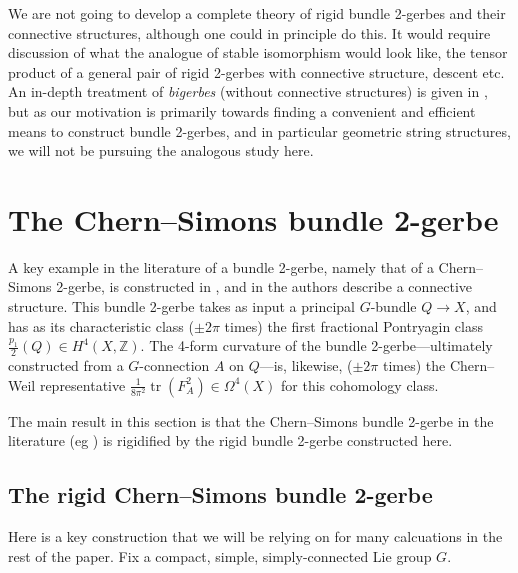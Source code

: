 \documentclass[12pt]{amsart}
\DeclareMathOperator{\tr}{tr}
\theoremstyle{plain}
\theoremstyle{definition}
\theoremstyle{remark}
\numberwithin{equation}{section}
\newcommand{\ZZ}{{\mathbb Z}}
\newcommand{\<}{\langle}
\renewcommand{\>}{\rangle}
\begin{document}

We are not going to develop a complete theory of rigid bundle 2-gerbes and their connective structures, although one could in principle do this. 
It would require discussion of what the analogue of stable isomorphism would look like, the tensor product of a general pair of rigid 2-gerbes with connective structure, descent etc. 
An in-depth treatment of \emph{bigerbes} (without connective structures) is given in \cite{KM19}, but as our motivation is primarily towards finding a convenient and efficient means to construct bundle 2-gerbes, and in particular geometric string structures, we will not be pursuing the analogous study here.





\section{The Chern--Simons bundle 2-gerbe}\label{sec:CS2-gerbe}

A key example in the literature of a bundle 2-gerbe, namely that of a Chern--Simons 2-gerbe, is constructed in \cite{StevPhD}, and in \cite{JohnsonPhD,CJMSW} the authors describe a connective structure.
This bundle 2-gerbe takes as input a principal $G$-bundle $Q\to X$, and has as its characteristic class ($\pm2\pi$ times) the first fractional Pontryagin class $\frac{p_1}{2}(Q)\in H^4(X,\ZZ)$. 
The 4-form curvature of the bundle 2-gerbe---ultimately constructed from a $G$-connection $A$ on $Q$---is, likewise, ($\pm 2\pi$ times) the Chern--Weil representative $\frac{1}{8\pi^2}\tr(F_A^2)\in \Omega^4(X)$ for this cohomology class.

The main result in this section is that the Chern--Simons bundle 2-gerbe in the literature (eg \cite{CJMSW}) is rigidified by the rigid bundle 2-gerbe constructed here.

\subsection{The rigid Chern--Simons bundle 2-gerbe}

Here is a key construction that we will be relying on for many calcuations in the rest of the paper. 
Fix a compact, simple, simply-connected Lie group $G$.
\end{document}
